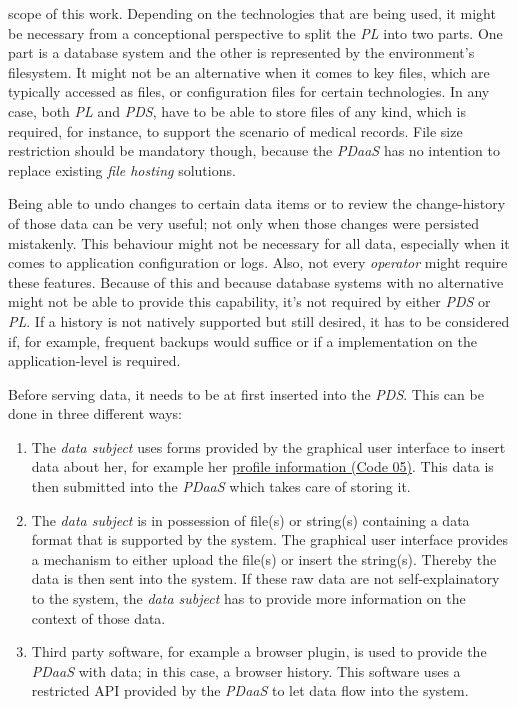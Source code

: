 \documentclass[12pt,english,a4paper,titlepage,cleardoublepage=empty,dottedtoc]{report}
\providecommand{\tightlist}{%
  \setlength{\itemsep}{0pt}\setlength{\parskip}{0pt}}
\begin{document}
scope of this work. Depending on the technologies that are being used,
it might be necessary from a conceptional perspective to split the
\emph{PL} into two parts. One part is a database system and the other is
represented by the environment's filesystem. It might not be an
alternative when it comes to key files, which are typically accessed as
files, or configuration files for certain technologies. In any case,
both \emph{PL} and \emph{PDS}, have to be able to store files of any
kind, which is required, for instance, to support the scenario of
medical records. File size restriction should be mandatory though,
because the \emph{PDaaS} has no intention to replace existing \emph{file
hosting} solutions.

Being able to undo changes to certain data items or to review the
change-history of those data can be very useful; not only when those
changes were persisted mistakenly. This behaviour might not be necessary
for all data, especially when it comes to application configuration or
logs. Also, not every \emph{operator} might require these features.
Because of this and because database systems with no alternative might
not be able to provide this capability, it's not required by either
\emph{PDS} or \emph{PL}. If a history is not natively supported but
still desired, it has to be considered if, for example, frequent backups
would suffice or if a implementation on the application-level is
required.

Before serving data, it needs to be at first inserted into the
\emph{PDS}. This can be done in three different ways:

\begin{enumerate}
\def\labelenumi{\alph{enumi})}
\tightlist
\item
  The \emph{data subject} uses forms provided by the graphical user
  interface to insert data about her, for example her
  \protect\hyperlink{code-05_struct_profile}{profile information (Code
  05)}. This data is then submitted into the \emph{PDaaS} which takes
  care of storing it.
\item
  The \emph{data subject} is in possession of file(s) or string(s)
  containing a data format that is supported by the system. The
  graphical user interface provides a mechanism to either upload the
  file(s) or insert the string(s). Thereby the data is then sent into
  the system. If these raw data are not self-explainatory to the system,
  the \emph{data subject} has to provide more information on the context
  of those data.
\item
  Third party software, for example a browser plugin, is used to provide
  the \emph{PDaaS} with data; in this case, a browser history. This
  software uses a restricted API provided by the \emph{PDaaS} to let
  data flow into the system.
\end{enumerate}
\end{document}
